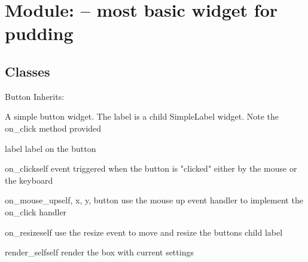 \section{Module:  -- most basic widget for pudding}
\subsection{Classes}
\begin{classdesc*}{Button}
Inherits:

A simple button widget. The label is a child SimpleLabel widget.
Note the on\_click method provided

\begin{memberdesc}{label}
label on the button
\end{memberdesc}

\begin{methoddesc}{on_click}{self}
event triggered when the button is "clicked" either by the mouse or the 
keyboard
\end{methoddesc}

\begin{methoddesc}{on_mouse_up}{self, x, y, button}
use the mouse up event handler to implement the on\_click handler
\end{methoddesc}

\begin{methoddesc}{on_resize}{self}
use the resize event to move and resize the buttons child label
\end{methoddesc}

\begin{methoddesc}{render_self}{self}
render the box with current settings
\end{methoddesc}

\end{classdesc*}

